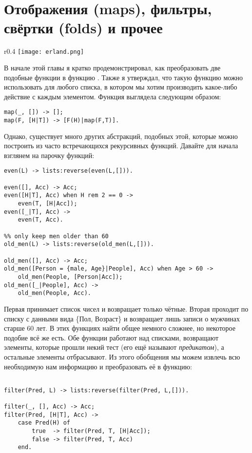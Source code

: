 \section{Отображения (maps), фильтры, свёртки (folds) и прочее}
\label{maps-filters-folds-and-more}
\begin{wrapfigure}{r}{0.4\linewidth}
    \texttt{[image: erland.png]}
\end{wrapfigure}
В начале этой главы я кратко продемонстрировал, как преобразовать две подобные функции в функцию .
Также я утверждал, что такую функцию можно использовать для любого списка, в котором мы хотим производить какое\--либо действие с каждым элементом.
Функция выглядела следующим образом:
\begin{lstlisting}[style=erlang]
map(_, []) -> [];
map(F, [H|T]) -> [F(H)|map(F,T)].
\end{lstlisting}
Однако, существует много других абстракций, подобных этой, которые можно построить из часто встречающихся рекурсивных функций.
Давайте для начала взглянем на парочку функций:
\begin{lstlisting}[style=erlang]
%% only keep even numbers
even(L) -> lists:reverse(even(L,[])).
 
even([], Acc) -> Acc;
even([H|T], Acc) when H rem 2 == 0 ->
    even(T, [H|Acc]);
even([_|T], Acc) ->
    even(T, Acc).
 
%% only keep men older than 60
old_men(L) -> lists:reverse(old_men(L,[])).
 
old_men([], Acc) -> Acc;
old_men([Person = {male, Age}|People], Acc) when Age > 60 ->
    old_men(People, [Person|Acc]);
old_men([_|People], Acc) ->
    old_men(People, Acc).
\end{lstlisting}

Первая принимает список чисел и возвращает только чётные.
Вторая проходит по списку с данными вида \{Пол, Возраст\} и возвращает лишь записи о мужчинах старше 60 лет.
В этих функциях найти общее немного сложнее, но некоторое подобие всё же есть.
Обе функции работают над списками, возвращают элементы, которые прошли некий тест (его ещё называют \emph{предикатом}), а остальные элементы отбрасывают.
Из этого обобщения мы можем извлечь всю необходимую нам информацию и преобразовать её в функцию:
\begin{lstlisting}[style=erlang]

filter(Pred, L) -> lists:reverse(filter(Pred, L,[])).
 
filter(_, [], Acc) -> Acc;
filter(Pred, [H|T], Acc) ->
    case Pred(H) of
        true  -> filter(Pred, T, [H|Acc]);
        false -> filter(Pred, T, Acc)
    end.
\end{lstlisting}

